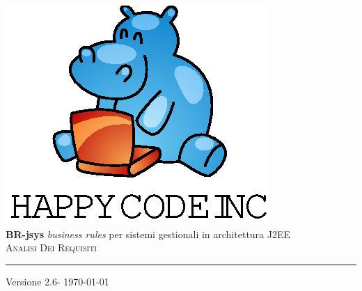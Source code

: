 \documentclass[11pt,titlepage,a4paper]{report}
\begin{document}
\newcommand{\lv}{2.6} %
\newcommand{\dt}{ Analisi Dei Requisiti }%
\newcommand{\Glossario}{ Glossario.1.4.pdf }



\begin{titlepage}\begin{center}
\vspace*{0.5in}
\includegraphics{logo.eps}
\vspace*{0.2in} \\
{\Large \textbf{BR-jsys}}
{\Large \emph{business rules} per sistemi gestionali in architettura J2EE } 
\vspace{2in} \\
\Huge \textsc{ \dt }
\par\rule{10cm}{0.4pt} \par {\large Versione \lv - \today} \\
\end{center}\end{titlepage}
\vspace*{0.5in}
\end{document}
